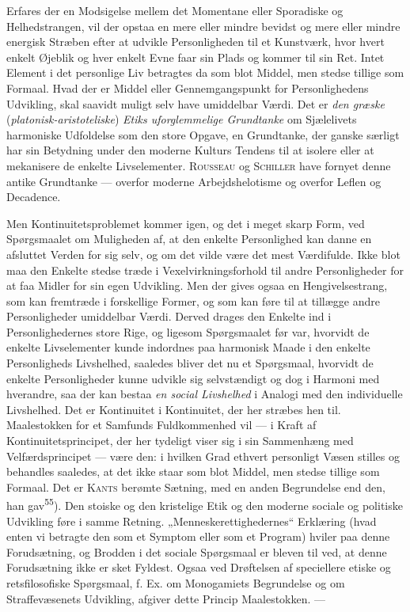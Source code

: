\documentclass[12pt,a4paper,openany]{book}
\newcommand{\opage}[1]{\marginnote{\footnotesize\textit{[#1]}}}
\begin{document}
Erfares der en Modsigelse mellem det Momentane eller Sporadiske og
Helhedstrangen, vil der opstaa en mere eller mindre bevidst og mere eller
mindre energisk Stræben efter at udvikle Personligheden til et Kunstværk, hvor
hvert enkelt Øjeblik og hver enkelt Evne faar sin Plads og kommer til sin Ret.
Intet Element i det personlige Liv betragtes da som blot Middel, men stedse
tillige som Formaal. Hvad der er Middel eller Gennemgangspunkt for
Personlighedens Udvikling, skal saavidt muligt selv have umiddelbar Værdi. Det
er \textit{den græske} (\textit{platonisk-aristoteliske})\textit{ Etiks
uforglemmelige Grundtanke} om Sjælelivets harmoniske
\opage{74}Udfoldelse som den store Opgave, en Grundtanke, der ganske særligt
har sin Betydning under den moderne Kulturs Tendens til at isolere eller at
mekanisere de enkelte Livselementer\textsc{. Rousseau} og \textsc{Schiller}
have fornyet denne antike Grundtanke --- overfor moderne Arbejdshelotisme og
overfor Leflen og Decadence.

Men Kontinuitetsproblemet kommer igen, og det i meget skarp Form, ved
Spørgsmaalet om Muligheden af, at den enkelte Personlighed kan danne en
afsluttet Verden for sig selv, og om det vilde være det mest Værdifulde. Ikke
blot maa den Enkelte stedse træde i Vexelvirkningsforhold til andre
Personligheder for at faa Midler for sin egen Udvikling. Men der gives ogsaa en
Hengivelsestrang, som kan fremtræde i forskellige Former, og som kan føre til
at tillægge andre Personligheder umiddelbar Værdi. Derved drages den Enkelte
ind i Personlighedernes store Rige, og ligesom Spørgsmaalet før var, hvorvidt
de enkelte Livselementer kunde indordnes paa harmonisk Maade i den enkelte
Personligheds Livshelhed, saaledes bliver det nu et Spørgsmaal, hvorvidt de
enkelte Personligheder kunne udvikle sig selvstændigt og dog i Harmoni med
hverandre, saa der kan bestaa \textit{en social Livshelhed} i Analogi med den
individuelle Livshelhed. Det er Kontinuitet i Kontinuitet, der her stræbes hen
til. Maalestokken for et Samfunds Fuldkommenhed vil --- i Kraft af
Kontinuitetsprincipet, der her tydeligt viser sig i sin Sammenhæng med
Velfærdsprincipet --- være den: i hvilken Grad ethvert personligt Væsen stilles
og behandles saaledes, at det ikke staar som blot Middel, men stedse tillige
som Formaal. Det er \textsc{Kants} berømte Sætning, med en anden Begrundelse
end den, han gav\textsuperscript{55}). Den stoiske og den kristelige Etik og
den moderne sociale og politiske Udvikling føre i samme Retning.
„Menneskerettighedernes“ Erklæring (hvad enten vi betragte den som et Symptom
eller som et Program) hviler paa denne Forudsætning, og Brodden i det sociale
Spørgsmaal er bleven til ved, at denne Forudsætning ikke er sket Fyldest. Ogsaa
ved Drøftelsen af speciellere etiske og retsfilosofiske Spørgsmaal, f. Ex. om
Monogamiets Begrundelse og om Straffevæsenets Udvikling, afgiver dette Princip
Maalestokken. ---
\end{document}
